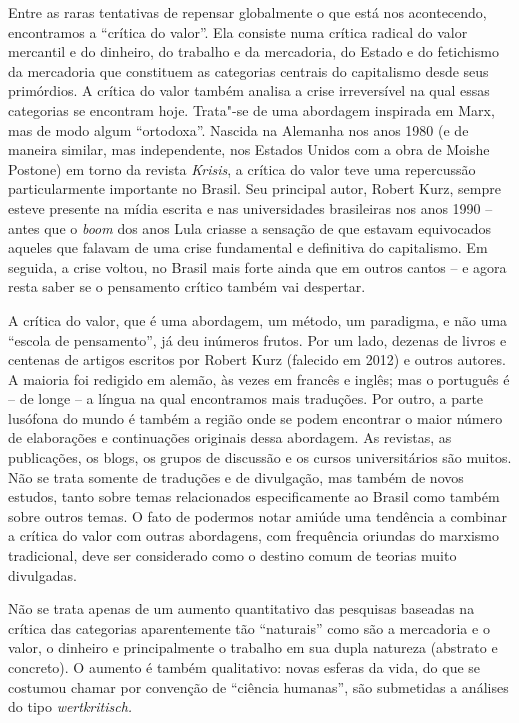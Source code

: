 Entre as raras tentativas de repensar globalmente o que está nos
acontecendo, encontramos a ``crítica do valor''. Ela consiste numa
crítica radical do valor mercantil e do dinheiro, do trabalho e da
mercadoria, do Estado e do fetichismo da mercadoria que constituem as
categorias centrais do capitalismo desde seus primórdios. A crítica do
valor também analisa a crise irreversível na qual essas categorias se
encontram hoje. Trata"-se de uma abordagem inspirada em Marx, mas de modo
algum ``ortodoxa''. Nascida na Alemanha nos anos 1980 (e de maneira
similar, mas independente, nos Estados Unidos com a obra de Moishe
Postone) em torno da revista \emph{Krisis}, a crítica do valor teve uma
repercussão particularmente importante no Brasil. Seu principal autor,
Robert Kurz, sempre esteve presente na mídia escrita e nas universidades
brasileiras nos anos 1990 -- antes que o \emph{boom} dos anos Lula
criasse a sensação de que estavam equivocados aqueles que falavam de uma
crise fundamental e definitiva do capitalismo. Em seguida, a crise
voltou, no Brasil mais forte ainda que em outros cantos -- e agora resta
saber se o pensamento crítico também vai despertar.

A crítica do valor, que é uma abordagem, um método, um paradigma, e não
uma ``escola de pensamento'', já deu inúmeros frutos. Por um lado,
dezenas de livros e centenas de artigos escritos por Robert Kurz
(falecido em 2012) e outros autores. A maioria foi redigido em alemão,
às vezes em francês e inglês; mas o português é -- de longe -- a língua
na qual encontramos mais traduções. Por outro, a parte lusófona do mundo
é também a região onde se podem encontrar o maior número de elaborações
e continuações originais dessa abordagem. As revistas, as publicações,
os blogs, os grupos de discussão e os cursos universitários são muitos.
Não se trata somente de traduções e de divulgação, mas também de novos
estudos, tanto sobre temas relacionados especificamente ao Brasil como
também sobre outros temas. O fato de podermos notar amiúde uma tendência
a combinar a crítica do valor com outras abordagens, com frequência
oriundas do marxismo tradicional, deve ser considerado como o destino
comum de teorias muito divulgadas.

Não se trata apenas de um aumento quantitativo das pesquisas baseadas na
crítica das categorias aparentemente tão ``naturais'' como são a
mercadoria e o valor, o dinheiro e principalmente o trabalho em sua
dupla natureza (abstrato e concreto). O aumento é também qualitativo:
novas esferas da vida, do que se costumou chamar por convenção de
``ciência humanas'', são submetidas a análises do tipo
\emph{wertkritisch.}

